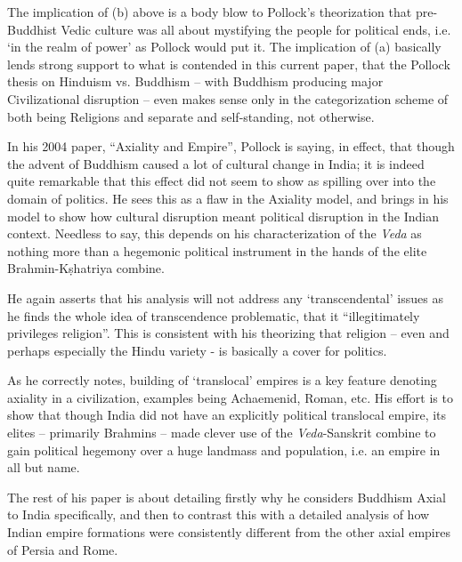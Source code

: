 The implication of (b) above is a body blow to Pollock’s theorization that pre-Buddhist Vedic culture was all about mystifying the people for political ends, i.e. ‘in the realm of power’ as Pollock would put it. The implication of (a) basically lends strong support to what is contended in this current paper, that the Pollock thesis on Hinduism vs. Buddhism – with Buddhism producing major Civilizational disruption – even makes sense only in the categorization scheme of both being Religions and separate and self-standing, not otherwise.

In his 2004 paper, “Axiality and Empire”, Pollock is saying, in effect, that though the advent of Buddhism caused a lot of cultural change in India; it is indeed quite remarkable that this effect did not seem to show as spilling over into the domain of politics. He sees this as a flaw in the Axiality model, and brings in his model to show how cultural disruption meant political disruption in the Indian context. Needless to say, this depends on his characterization of the \textit{Veda} as nothing more than a hegemonic political instrument in the hands of the elite Brahmin-Kṣhatriya combine.

He again asserts that his analysis will not address any ‘transcendental’ issues as he finds the whole idea of transcendence problematic, that it “illegitimately privileges religion”. This is consistent with his theorizing that religion – even and perhaps especially the Hindu variety - is basically a cover for politics.

As he correctly notes, building of ‘translocal’ empires is a key feature denoting axiality in a civilization, examples being Achaemenid, Roman, etc. His effort is to show that though India did not have an explicitly political translocal empire, its elites – primarily Brahmins – made clever use of the \textit{Veda}-Sanskrit combine to gain political hegemony over a huge landmass and population, i.e. an empire in all but name.

The rest of his paper is about detailing firstly why he considers Buddhism Axial to India specifically, and then to contrast this with a detailed analysis of how Indian empire formations were consistently different from the other axial empires of Persia and Rome.

\vspace{.1cm}

